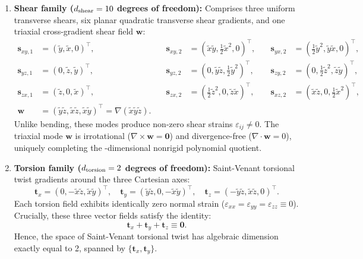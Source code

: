 \documentclass[11pt]{article}
\begin{document}
\begin{enumerate}[label=(\roman*)]
\item \textbf{Shear family ($d_{\rm shear} = 10$ degrees of freedom):}
Comprises three uniform transverse shears, six planar quadratic transverse shear gradients, and one triaxial cross-gradient shear field $\mathbf w$:
\begin{equation}
\begin{aligned}
\mathbf s_{xy,1} &= (\tilde y, \tilde x, 0)^\top, &\quad \mathbf s_{xy,2} &= (\tilde x \tilde y, \tfrac{1}{2}\tilde x^2, 0)^\top, &\quad \mathbf s_{yx,2} &= (\tfrac{1}{2}\tilde y^2, \tilde y \tilde x, 0)^\top, \\
\mathbf s_{yz,1} &= (0, \tilde z, \tilde y)^\top, &\quad \mathbf s_{yz,2} &= (0, \tilde y \tilde z, \tfrac{1}{2}\tilde y^2)^\top, &\quad \mathbf s_{zy,2} &= (0, \tfrac{1}{2}\tilde z^2, \tilde z \tilde y)^\top, \\
\mathbf s_{zx,1} &= (\tilde z, 0, \tilde x)^\top, &\quad \mathbf s_{zx,2} &= (\tfrac{1}{2}\tilde z^2, 0, \tilde z \tilde x)^\top, &\quad \mathbf s_{xz,2} &= (\tilde x \tilde z, 0, \tfrac{1}{2}\tilde x^2)^\top, \\
\mathbf w &= (\tilde y \tilde z, \tilde x \tilde z, \tilde x \tilde y)^\top = \nabla(\tilde x \tilde y \tilde z).
\end{aligned}
\label{eq:shear-family}
\end{equation}
Unlike bending, these modes produce non-zero shear strains $\varepsilon_{ij} \ne 0$.
The triaxial mode $\mathbf w$ is irrotational ($\nabla \times \mathbf w = \mathbf 0$) and divergence-free ($\nabla \cdot \mathbf w = 0$), uniquely completing the \NonrigidDOFs-dimensional nonrigid polynomial quotient.

\item \textbf{Torsion family ($d_{\rm torsion} = 2$ degrees of freedom):}
Saint-Venant torsional twist gradients around the three Cartesian axes:
\begin{equation}
\mathbf t_x = (0, -\tilde x \tilde z, \tilde x \tilde y)^\top, \quad
\mathbf t_y = (\tilde y \tilde z, 0, -\tilde x \tilde y)^\top, \quad
\mathbf t_z = (-\tilde y \tilde z, \tilde x \tilde z, 0)^\top.
\label{eq:torsion-family}
\end{equation}
Each torsion field exhibits identically zero normal strain ($\varepsilon_{xx} = \varepsilon_{yy} = \varepsilon_{zz} \equiv 0$).
Crucially, these three vector fields satisfy the identity:
\begin{equation}
\mathbf t_x + \mathbf t_y + \mathbf t_z \equiv \mathbf 0.
\end{equation}
Hence, the space of Saint-Venant torsional twist has algebraic dimension exactly equal to 2, spanned by $\{\mathbf t_x, \mathbf t_y\}$.
\end{enumerate}
\end{document}
